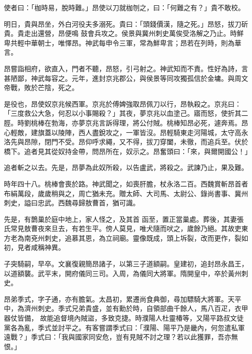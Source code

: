 \begin{pinyinscope}
 使者曰：「枷時易，脫時難。」昂使以刀就枷刎之，曰：「何難之有？」貴不敢校。



 明日，貴與昂坐，外白河役夫多溺死。貴曰：「頭錢價漢，隨之死。」昂怒，拔刀斫貴。貴走出還營，昂便鳴
 鼓會兵攻之。侯景與冀州刺史萬俟受洛解之乃止。時鮮卑共輕中華朝士，唯懌昂。神武每申令三軍，常為鮮卑言；昂若在列時，則為華言。



 昂嘗詣相府，欲直入，門者不聽，昂怒，引弓射之。神武知而不責。性好為詩，言甚陋鄙，神武每容之。元年，進封京兆郡公，與侯景等同攻獨孤信於金墉。與周文帝戰，敗於芒陰，死之。



 是役也，昂使奴京兆候西軍。京兆於傅婢強取昂佩刀以行，昂執殺之。京兆曰：「三度救公大急，何忍以小事賜殺？」其夜，夢京兆以血塗己。寤而怒，使折其二脛。時劉桃棒在勃海，亦夢京兆言訴得理，將公付賊。桃棒知昂必死，遽奔焉。昂
 心輕敵，建旗蓋以陵陣，西人盡銳攻之，一軍皆沒。昂輕騎東走河陽城，太守高永洛先與昂隙，閉門不受。昂仰呼求繩，又不得，拔刀穿闔，未徹，而追兵至。伏於橋下。追者見其從奴持金帶，問昂所在，奴示之。昂奮頭曰：「來，與爾開國公！」



 追者斬之以去。先是，昂夢為此奴所殺，以告盧武，將殺之。武諫乃止，果及難。



 時年四十八。桃棒會喪於路。神武聞之，如喪肝膽，杖永洛二百。西魏賞斬昂首者布絹萬段，歲歲稍與之，周亡猶未充。贈太師、大司馬、太尉公、錄尚書事、冀州刺史，謚曰忠武。西魏尋歸敖曹首，猶可識。



 先是，有鵲巢於庭中地上，家人怪之，及其首
 函至，置正當巢處。葬後，其妻張氏常見敖曹夜來旦去，有若生平。傍人莫見，唯犬隨而吠之，歲餘乃絕。其故吏東方老為南兗州刺史，追慕其恩，為立祠廟。靈像既成，頭上坼裂，改而更作，裂如初，見者咸稱神異。



 子突騎嗣，早卒。文襄復親簡昂諸子，以第三子道額嗣。皇建初，追封昂永昌王，以道額襲。武平末，開府儀同三司。入周，為儀同大將軍。隋開皇中，卒於黃州刺史。



 昂弟季式，字子通，亦有膽氣。太昌初，累遷尚食典御，尋加驃騎大將軍。天平中，為濟州刺史。季式兄弟貴盛，並有勳於時，自領部曲千餘人，馬八百疋，衣甲器仗皆備，
 故能追督境內賊盜，多致克捷。時濮陽人杜靈椿等，又陽平路叔文徒黨各為亂，季式並討平之。有客嘗謂季式曰：「濮陽、陽平乃是畿內，何忽遣私軍遠戰？」季式曰：「我與國家同安危，豈有見賊不討之理？若以此獲罪，吾亦無恨。」




\end{pinyinscope}
